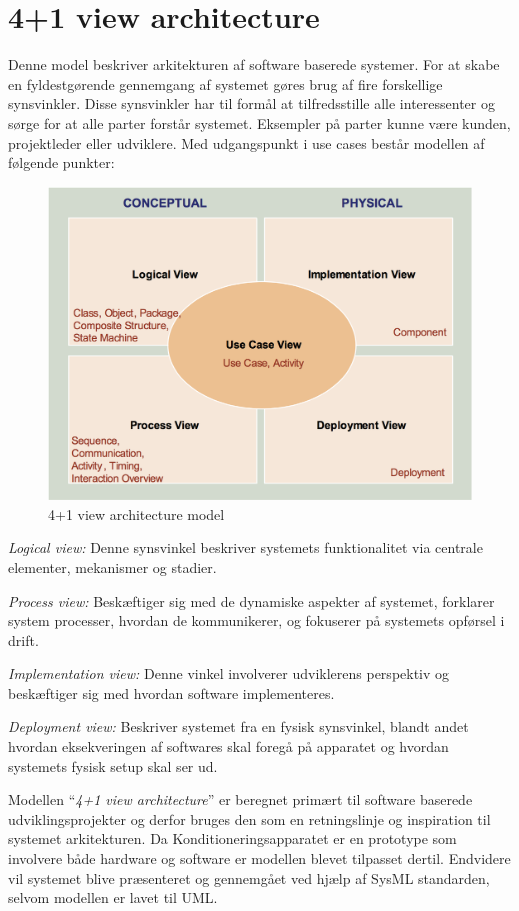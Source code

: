 \section{4+1 view architecture} \label{title:viewArc}
Denne model beskriver arkitekturen af software baserede systemer. For at skabe en fyldestgørende gennemgang af systemet gøres brug af fire forskellige synsvinkler. Disse synsvinkler har til formål at  tilfredsstille alle interessenter og sørge for at alle parter forstår systemet. Eksempler på parter kunne være kunden, projektleder eller udviklere. Med udgangspunkt i use cases består modellen af følgende punkter: 

\begin{figure}[H]
	\includegraphics[width=\textwidth]{SystemArkitektur/filer/4plus1model.png}
	\caption{4+1 view architecture model}\label{fig:4plus1model}
\end{figure}

\textit{Logical view:} Denne synsvinkel beskriver systemets funktionalitet via centrale elementer, mekanismer og stadier.

\textit{Process view:} Beskæftiger sig med de dynamiske aspekter af systemet, forklarer system processer, hvordan de kommunikerer, og fokuserer på systemets opførsel i drift.

\textit{Implementation view:} Denne vinkel involverer udviklerens perspektiv og beskæftiger sig med hvordan software implementeres.

\textit{Deployment view:} Beskriver systemet fra en fysisk synsvinkel, blandt andet hvordan eksekveringen af softwares skal foregå på apparatet og hvordan systemets fysisk setup skal ser ud. 

Modellen “\textit{4+1 view architecture}” er beregnet primært til software baserede udviklingsprojekter og derfor bruges den som en retningslinje og inspiration til systemet arkitekturen. Da Konditioneringsapparatet er en prototype som involvere både hardware og software er modellen blevet tilpasset dertil. Endvidere vil systemet blive præsenteret og gennemgået ved hjælp af SysML standarden, selvom modellen er lavet til UML.

